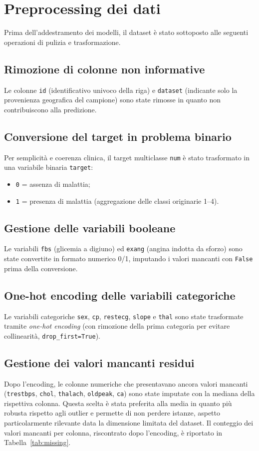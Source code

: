 \documentclass[12pt]{article}
\begin{document}
\section{Preprocessing dei dati}

Prima dell'addestramento dei modelli, il dataset è stato sottoposto alle seguenti operazioni di pulizia e trasformazione.

\subsection{Rimozione di colonne non informative}
Le colonne \texttt{id} (identificativo univoco della riga) e \texttt{dataset} (indicante solo la provenienza geografica del campione) sono state rimosse in quanto non contribuiscono alla predizione.

\subsection{Conversione del target in problema binario}
Per semplicità e coerenza clinica, il target multiclasse \texttt{num} è stato trasformato in una variabile binaria \texttt{target}:
\begin{itemize}
    \item \texttt{0} = assenza di malattia;
    \item \texttt{1} = presenza di malattia (aggregazione delle classi originarie 1--4).
\end{itemize}

\subsection{Gestione delle variabili booleane}
Le variabili \texttt{fbs} (glicemia a digiuno) ed \texttt{exang} (angina indotta da sforzo) sono state convertite in formato numerico 0/1, imputando i valori mancanti con \texttt{False} prima della conversione.

\subsection{One-hot encoding delle variabili categoriche}
Le variabili categoriche \texttt{sex}, \texttt{cp}, \texttt{restecg}, \texttt{slope} e \texttt{thal} sono state trasformate tramite \emph{one-hot encoding} (con rimozione della prima categoria per evitare collinearità, \texttt{drop\_first=True}).

\subsection{Gestione dei valori mancanti residui}
Dopo l'encoding, le colonne numeriche che presentavano ancora valori mancanti (\texttt{trestbps}, \texttt{chol}, \texttt{thalach}, \texttt{oldpeak}, \texttt{ca}) sono state imputate con la mediana della rispettiva colonna. Questa scelta è stata preferita alla media in quanto più robusta rispetto agli outlier e permette di non perdere istanze, aspetto particolarmente rilevante data la dimensione limitata del dataset. Il conteggio dei valori mancanti per colonna, riscontrato dopo l'encoding, è riportato in Tabella~\ref{tab:missing}.
\end{document}
